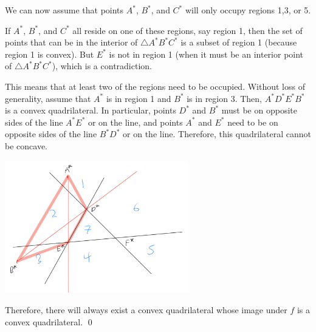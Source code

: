 \documentclass[10pt]{../usamts}
\begin{document}
\begin{solution}
We can now assume that points $A^*$, $B^*$, and $C^*$ will only occupy regions 1,3, or 5.

If $A^*$, $B^*$, and $C^*$ all reside on one of these regions, say region 1, then the set of points that can be in the interior of $\triangle A^*B^*C^*$ is a subset of region 1 (because region 1 is convex). But $E^*$ is not in region 1 (when it must be an interior point of $\triangle A^*B^*C^*$), which is a contradiction.

This means that at least two of the regions need to be occupied. Without loss of generality, assume that $A^*$ is in region 1 and $B^*$ is in region 3. Then, $A^*D^*E^*B^*$ is a convex quadrilateral. In particular, points $D^*$ and $B^*$ must be on opposite sides of the line $A^*E^*$ or on the line, and points $A^*$ and $E^*$ need to be on opposite sides of the line $B^*D^*$ or on the line. Therefore, this quadrilateral cannot be concave.

\begin{center}
    \includegraphics[width=8cm]{round3/p4diagram_2.jpeg}
\end{center}

Therefore, there will always exist a convex quadrilateral whose image under $f$ is a convex quadrilateral.
\hfill\qed
\end{solution}
\end{document}
